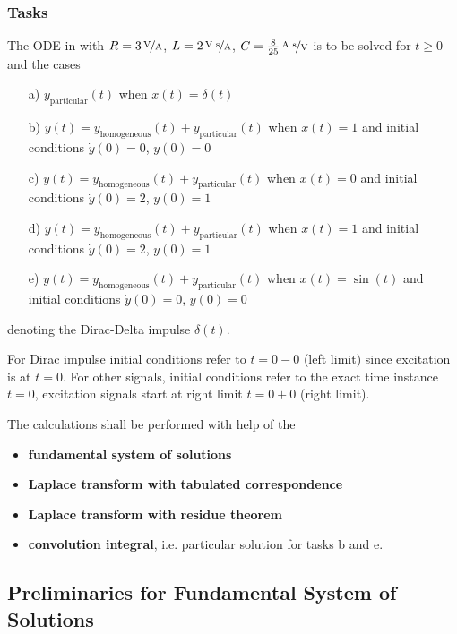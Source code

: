 \documentclass[11pt,a4paper,DIV=12]{scrartcl}
\begin{document}
\subsubsection{Tasks}
The ODE in  with
$R = 3\,\nicefrac{\text{V}}{\text{A}}$,
$L=2\,\nicefrac{\text{V s}}{\text{A}}$,
$C=\frac{8}{25}\,\nicefrac{\text{A s}}{\text{V}}$
is to be solved for $t\geq 0$ and the cases
\begin{itemize}
\item[a)] $y_\text{particular}(t)$ when $x(t)=\delta(t)$
\item[b)] $y(t) = y_\text{homogeneous}(t)+y_\text{particular}(t)$ when
$x(t)=1$ and initial conditions $\dot{y}(0) = 0$, $y(0)=0$
\item[c)] $y(t) = y_\text{homogeneous}(t)+y_\text{particular}(t)$ when $x(t)=0$
and initial conditions $\dot{y}(0) = 2$, $y(0)=1$
\item[d)] $y(t) = y_\text{homogeneous}(t)+y_\text{particular}(t)$ when $x(t)=1$
and initial conditions $\dot{y}(0) = 2$, $y(0)=1$
\item[e)] $y(t) = y_\text{homogeneous}(t)+y_\text{particular}(t)$ when $x(t)=\sin(t)$
and initial conditions $\dot{y}(0) = 0$, $y(0)=0$
\end{itemize}
denoting the Dirac-Delta impulse $\delta(t)$.
%

For Dirac impulse initial conditions refer to $t=0-0$ (left limit) since excitation is at $t=0$.
For other signals, initial conditions refer to the exact time instance $t=0$,
excitation signals start at right limit $t=0+0$ (right limit).
%

The calculations shall be performed with help of the
\begin{itemize}
\item \textbf{fundamental system of solutions}
\item \textbf{Laplace transform with tabulated correspondence}
\item \textbf{Laplace transform with residue theorem}
\item \textbf{convolution integral}, i.e. particular solution for tasks b and e.
\end{itemize}


\newpage
\subsection{Preliminaries for Fundamental System of Solutions}
\end{document}
